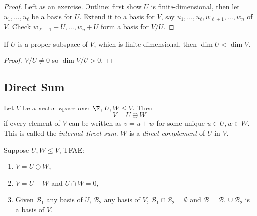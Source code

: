 \documentclass[a4paper]{article}
\newcommand*{\basis}{\mathcal}
\theoremstyle{definition}
\begin{document}
\begin{proof}
  Left as an exercise. Outline: first show \(U\) is finite-dimensional, then let \(u_1,\ldots,u_\ell\) be a basis for \(U\). Extend it to a basis for \(V\), say \(u_1,\ldots,u_\ell,w_{\ell+1},\ldots,w_n\) of \(V\). Check \(w_{\ell+1}+U,\ldots,w_n+U\) form a basis for \(V/U\).
\end{proof}

\begin{corollary}
  If \(U\) is a proper subspace of \(V\), which is finite-dimensional, then \(\dim U < \dim V\).
\end{corollary}

\begin{proof}
  \(V/U \neq 0\) so \(\dim V/U > 0\).
\end{proof}

\subsection{Direct Sum}

\begin{definition}
  Let \(V\) be a vector space over \(\F\), \(U, W\leq V\). Then
  \[
    V = U \oplus W
  \]
  if every element of \(V\) can be written as \(v=u+w\) for some unique \(u\in U, w\in W\). This is called the \emph{internal direct sum}. \(W\) is a \emph{direct complement} of \(U\) in \(V\).
\end{definition}

\begin{lemma}
  Suppose \(U,W\leq V\), TFAE:
  \begin{enumerate}
  \item \(V = U \oplus W\),
  \item \(V=U+W\) and \(U\cap W = 0\),
  \item Given \(\basis B_1\) any basis of \(U\), \(\basis B_2\) any basis of \(V\), \(\basis B_1 \cap \basis B_2 = \emptyset\) and \(\basis B = \basis B_1\cup \basis B_2\) is a basis of \(V\).
  \end{enumerate}
\end{lemma}
\end{document}
